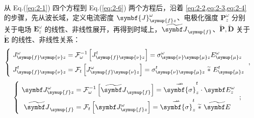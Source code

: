 从 Eq.(\ref{eq:2-1}) 四个方程到 Eq.(\ref{eq:2-6}) 两个方程后，沿着 \cref{eq:2-2,eq:2-3,eq:2-4} 的步骤，先从波长域，定义电流密度 $\symbf{J}^\omega_{{\symup{f}}z}$、电极化强度 $\symbf{P}^\omega_{z}$ 分别关于电场 $\symbf{E}^\omega_{z}$ 的线性、非线性展开，再得到时域上，$\widetilde{\symbf J}_{\symup{f}}$、$ \widetilde{\symbf P}, \widetilde{\symbf D}$ 关于 $\widetilde{\symbf E}$ 的线性、非线性关系：
\begin{equation} \label{eq:2-7}
    \belowdisplayskip=10pt
	\left\{\ \begin{aligned} J^\omega_{{\symup{f}}{\symup{\nu}} z} &= \mathcal F^{-1}_\omega \left[ J^t_{{\symup{f}}{\symup{\nu}} z} \right] = \sigma^{\omega}_{{\symup{\nu}} {\symup{\mu}} z} E^\omega_{{\symup{\mu}} z} \\ J^t_{{\symup{f}}{\symup{\nu}} z} &= \mathcal F_t \left[ J^\omega_{{\symup{f}}{\symup{\nu}} z} \right] = \sigma^{t}_{{\symup{\nu}} {\symup{\mu}} z}\ \widetilde *\ E^t_{{\symup{\mu}} z} \end{aligned}\right. ~,
\end{equation}
\begin{equation} \label{eq:2-8}
	\left\{\ \begin{aligned} \symbf J^\omega_{\symup{f} z} &= \mathcal F^{-1}_\omega \left[ \widetilde{\symbf J}_{\symup{f}} \right] = \overset{\rightharpoonup\!\!\!\! \rightharpoonup}{\symbf{\sigma}}^{t}_{z} \cdot \symbf E^{\omega}_z \\ \widetilde{\symbf J}_{\symup{f}} &= \mathcal F_t \left[ \symbf J^{\omega}_{\symup{f} z} \right] = \overset{\rightharpoonup\!\!\!\! \rightharpoonup}{\symbf{\sigma}}^{t}_{z}\ \widetilde *\ \widetilde{\symbf E} \end{aligned}\right. ~;
\end{equation}
